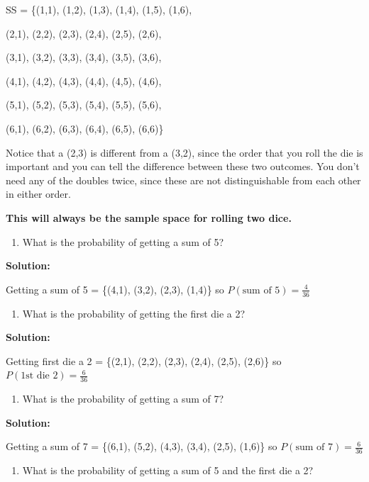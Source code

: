 \documentclass[
]{book}
\providecommand{\tightlist}{%
  \setlength{\itemsep}{0pt}\setlength{\parskip}{0pt}}
\begin{document}
SS = \{(1,1), (1,2), (1,3), (1,4), (1,5), (1,6),

(2,1), (2,2), (2,3), (2,4), (2,5), (2,6),

(3,1), (3,2), (3,3), (3,4), (3,5), (3,6),

(4,1), (4,2), (4,3), (4,4), (4,5), (4,6),

(5,1), (5,2), (5,3), (5,4), (5,5), (5,6),

(6,1), (6,2), (6,3), (6,4), (6,5), (6,6)\}

Notice that a (2,3) is different from a (3,2), since the order that you roll the die is important and you can tell the difference between these two outcomes. You don't need any of the doubles twice, since these are not distinguishable from each other in either order.

\textbf{This will always be the sample space for rolling two dice.}

\begin{enumerate}
\def\labelenumi{\alph{enumi}.}
\setcounter{enumi}{1}
\tightlist
\item
  What is the probability of getting a sum of 5?
\end{enumerate}

\textbf{Solution:}

Getting a sum of 5 = \{(4,1), (3,2), (2,3), (1,4)\} so \(P(\text{sum of 5})=\frac{4}{36}\)

\begin{enumerate}
\def\labelenumi{\alph{enumi}.}
\setcounter{enumi}{2}
\tightlist
\item
  What is the probability of getting the first die a 2?
\end{enumerate}

\textbf{Solution:}

Getting first die a 2 = \{(2,1), (2,2), (2,3), (2,4), (2,5), (2,6)\} so \(P(\text{1st die 2})=\frac{6}{36}\)

\begin{enumerate}
\def\labelenumi{\alph{enumi}.}
\setcounter{enumi}{3}
\tightlist
\item
  What is the probability of getting a sum of 7?
\end{enumerate}

\textbf{Solution:}

Getting a sum of 7 = \{(6,1), (5,2), (4,3), (3,4), (2,5), (1,6)\} so \(P(\text{sum of 7})=\frac{6}{36}\)

\begin{enumerate}
\def\labelenumi{\alph{enumi}.}
\setcounter{enumi}{4}
\tightlist
\item
  What is the probability of getting a sum of 5 and the first die a 2?
\end{enumerate}
\end{document}
